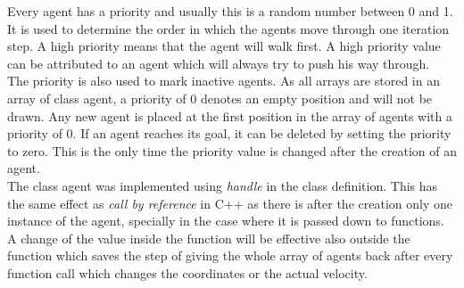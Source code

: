 \noi Every agent has a priority and usually this is a random number between 0 and 1. It is used to determine the order in which the agents move through one iteration step. A high priority means that the agent will walk first. A high priority value can be attributed to an agent which will always try to push his way through.\\
The priority is also used to mark inactive agents. As all arrays are stored in an array of class agent, a priority of 0 denotes an empty position and will not be drawn. Any new agent is placed at the first position in the array of agents with a priority of 0. If an agent reaches its goal, it can be deleted by setting the priority to zero. This is the only time the priority value is changed after the creation of an agent.\\

\noi The class agent was implemented using \textit{handle} in the class definition. This has the same effect as \textit{call by reference} in C++ as there is after the creation only one instance of the agent, specially in the case where it is passed down to functions. A change of the value inside the function will be effective also outside the function which saves the step of giving the whole array of agents back after every function call which changes the coordinates or the actual velocity.
